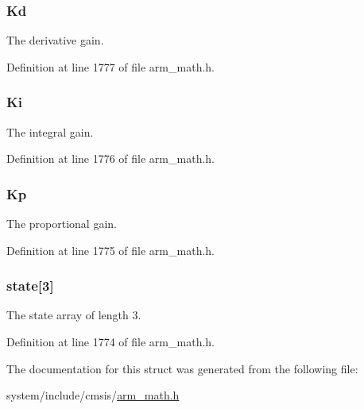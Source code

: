 \subsubsection[{\texorpdfstring{Kd}{Kd}}]{ Kd}\hypertarget{structarm__pid__instance__f32_ace6b9e405a991cbaf6b4c137ca0d51a3}{}\label{structarm__pid__instance__f32_ace6b9e405a991cbaf6b4c137ca0d51a3}
The derivative gain. 

Definition at line 1777 of file arm\+\_\+math.\+h.

\subsubsection[{\texorpdfstring{Ki}{Ki}}]{ Ki}\hypertarget{structarm__pid__instance__f32_ad1a1aa1c10a2dca201a3422f82198777}{}\label{structarm__pid__instance__f32_ad1a1aa1c10a2dca201a3422f82198777}
The integral gain. 

Definition at line 1776 of file arm\+\_\+math.\+h.

\subsubsection[{\texorpdfstring{Kp}{Kp}}]{ Kp}\hypertarget{structarm__pid__instance__f32_abe23f3e122ef5f55398fcf77c793c425}{}\label{structarm__pid__instance__f32_abe23f3e122ef5f55398fcf77c793c425}
The proportional gain. 

Definition at line 1775 of file arm\+\_\+math.\+h.

\subsubsection[{\texorpdfstring{state}{state}}]{ state\mbox{[}3\mbox{]}}\hypertarget{structarm__pid__instance__f32_a473556ac6100fc188e77930d56f51062}{}\label{structarm__pid__instance__f32_a473556ac6100fc188e77930d56f51062}
The state array of length 3. 

Definition at line 1774 of file arm\+\_\+math.\+h.



The documentation for this struct was generated from the following file\+:\begin{DoxyCompactItemize}
\item 
system/include/cmsis/\hyperlink{arm__math_8h}{arm\+\_\+math.\+h}\end{DoxyCompactItemize}
